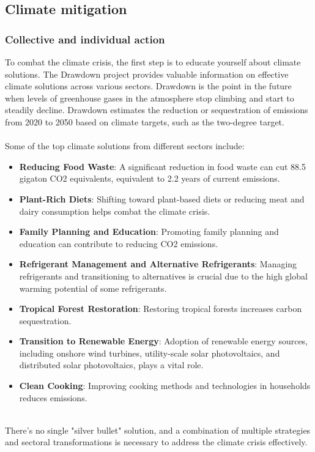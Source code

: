 \documentclass[../summary.tex]{subfiles}
\begin{document}
\subsection{Climate mitigation}
\subsubsection{Collective and individual action}

To combat the climate crisis, the first step is to educate yourself about climate solutions. The Drawdown project provides valuable information on effective climate solutions across various sectors. Drawdown is the point in the future when levels of greenhouse gases in the atmosphere stop climbing and start to steadily decline. Drawdown estimates the reduction or sequestration of emissions from 2020 to 2050 based on climate targets, such as the two-degree target.\\
\\
Some of the top climate solutions from different sectors include:

\begin{itemize}
	\item \textbf{Reducing Food Waste}: A significant reduction in food waste can cut 88.5 gigaton CO2 equivalents, equivalent to 2.2 years of current emissions.
	\item \textbf{Plant-Rich Diets}: Shifting toward plant-based diets or reducing meat and dairy consumption helps combat the climate crisis.
	\item \textbf{Family Planning and Education}: Promoting family planning and education can contribute to reducing CO2 emissions.
	\item \textbf{Refrigerant Management and Alternative Refrigerants}: Managing refrigerants and transitioning to alternatives is crucial due to the high global warming potential of some refrigerants.
	\item \textbf{Tropical Forest Restoration}: Restoring tropical forests increases carbon sequestration.
	\item \textbf{Transition to Renewable Energy}: Adoption of renewable energy sources, including onshore wind turbines, utility-scale solar photovoltaics, and distributed solar photovoltaics, plays a vital role.
	\item \textbf{Clean Cooking}: Improving cooking methods and technologies in households reduces emissions.
\end{itemize}
\ \\
There's no single "silver bullet" solution, and a combination of multiple strategies and sectoral transformations is necessary to address the climate crisis effectively.
\end{document}
